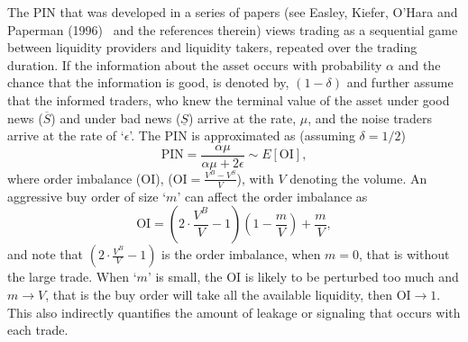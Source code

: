 The PIN that was developed in a series of papers (see Easley, Kiefer, O'Hara and Paperman (1996)~\cite{paper} and the references therein) views trading as a sequential game between liquidity providers and liquidity takers, repeated over the trading duration. If the information about the asset occurs with probability $\alpha$ and the chance that the information is good, is denoted by, $(1 - \delta)$ and further assume that the informed traders, who knew the terminal value of the asset under good news ($\overline{S}$) and under bad news ($\underline{S}$) arrive at the rate, $\mu$, and the noise traders arrive at the rate of `$\epsilon$'. The PIN is approximated as (assuming $\delta= 1/2$)
	\begin{equation} \label{eqn:pin}
	\text{PIN}= \dfrac{\alpha\mu}{\alpha\mu + 2\epsilon} \sim E[\text{OI}],
	\end{equation}
where order imbalance (OI), ($\text{OI}= \frac{V^B - V^S}{V}$), with $V$ denoting the volume. An aggressive buy order of size `$m$' can affect the order imbalance as
	\begin{equation} \label{eqn:oi}
	\text{OI}=\left( 2 \cdot \dfrac{V^B}{V} - 1 \right) \left(1 - \dfrac{m}{V} \right) + \dfrac{m}{V},
	\end{equation}
and note that $\left( 2 \cdot \frac{V^B}{V} - 1 \right)$ is the order imbalance, when $m= 0$, that is without the large trade. When `$m$' is small, the OI is likely to be perturbed too much and $m \to V$, that is the buy order will take all the available liquidity, then $\text{OI} \to1$. This also indirectly quantifies the amount of leakage or signaling that occurs with each trade.


